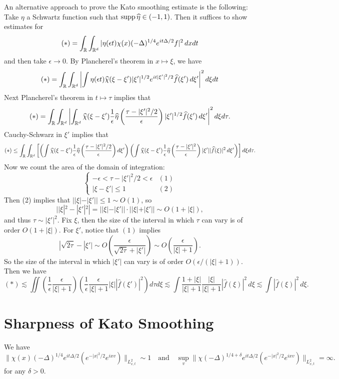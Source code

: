 \begin{remark}
  An alternative approach to prove the Kato smoothing
  estimate is the following: Take $\eta$ a
  Schwartz function such that
  $\operatorname{supp} \widehat{\eta} \in (-1, 1)$. Then it suffices
  to show estimates for
  \[
    (*) = \int_{\mathbb{R}} \int_{\mathbb{R}^d}
    |\eta(\epsilon t) \chi(x) (-\Delta)^{1 / 4} e^{it \Delta / 2} f|^2\, dx dt
  \]
  and then take $\epsilon \to 0$. By Plancherel's
  theorem in $x \mapsto \xi$, we have
  \[
    (*) = \int_{\mathbb{R}} \int_{\mathbb{R}^d}
    \left| \int \eta(\epsilon t) \widehat{\chi}(\xi - \xi') |\xi'|^{1 / 2} e^{it|\xi'|^2 / 2} \widehat{f}(\xi')\, d\xi' \right|^2 d\xi dt
  \]
  Next Plancherel's theorem in $t \mapsto \tau$
  implies that
  \[
    (*) = \int_{\mathbb{R}} \int_{\mathbb{R}^d}
    \left|
    \int_{\mathbb{R}^d} \widehat{\chi}(\xi - \xi')
    \frac{1}{\epsilon} \widehat{\eta}\left(\frac{\tau - |\xi'|^2 / 2}{\epsilon}\right) |\xi'|^{1 / 2} \widehat{f}(\xi')\, d\xi'
    \right|^2 d\xi d\tau.
  \]
  Cauchy-Schwarz in $\xi'$ implies that
  \[
    (*) \le
    \int_{\mathbb{R}} \int_{\mathbb{R}^d}
    \left[\left(\int \widehat{\chi}(\xi - \xi') \frac{1}{\epsilon} \widehat{\eta}\left(\frac{\tau - |\xi'|^2 / 2}{\epsilon}\right) d\xi'\right)
    \left(\int \widehat{\chi}(\xi - \xi') \frac{1}{\epsilon} \widehat{\eta} \left(\frac{\tau - |\xi'|^2}{\epsilon}\right) |\xi'| |\widehat{f}(\xi)|^2\, d\xi'\right)\right]
    d\xi d\tau
  .\]
  Now we count the area of the domain of integration:
  \[
    \begin{cases}
      -\epsilon < \tau - |\xi'|^2 / 2 < \epsilon & (1) \\
      |\xi - \xi'| \le 1 & (2)
    \end{cases}
  \]
  Then (2) implies that
  $||\xi| - |\xi'|| \le 1 \sim O(1)$, so
  \[
    ||\xi|^2 - |\xi'|^2|
    = ||\xi| - |\xi'|| \cdot ||\xi| + |\xi'||
    \sim O(1 + |\xi|),
  \]
  and thus $\tau \sim |\xi'|^2$. Fix $\xi$, then
  the size of the interval in which $\tau$ can vary
  is of order $O(1 + |\xi|)$. For $\xi'$,
  notice that $(1)$ implies
  \[
    |\sqrt{2\tau} - |\xi'|
    \sim O\left(\frac{\epsilon}{\sqrt{2\tau} + |\xi'|}\right)
    \sim O\left(\frac{\epsilon}{|\xi| + 1}\right).
  \]
  So the size of the interval in which
  $|\xi'|$ can vary is of order
  $O(\epsilon / (|\xi| + 1))$.  Then we have
  \[
    (*) \lesssim \iint \left(\frac{1}{\epsilon} \frac{\epsilon}{|\xi| + 1}\right)\left(\frac{1}{\epsilon} \frac{\epsilon}{|\xi| + 1}|\xi| |\widehat{f}(\xi')|^2\right) d\tau d\xi
    \lesssim \int \frac{1+ |\xi|}{|\xi| + 1} \frac{|\xi|}{|\xi| + 1} |\widehat{f}(\xi)|^2 \, d\xi
    \lesssim \int |\widehat{f}(\xi)|^2 \, d\xi.
  \]
\end{remark}

\section{Sharpness of Kato Smoothing}

\begin{lemma}
  We have
  \[
    \|\chi(x) (-\Delta)^{1 / 4} e^{i t \Delta / 2} (e^{-|x|^2 / 2} e^{ixv})\|_{L^2_{x, t}} \sim 1
    \quad \text{and} \quad
    \sup_{v} \| \chi (-\Delta)^{1 / 4 + \delta} e^{it\Delta / 2} (e^{-|x|^2 / 2} e^{ixv}) \|_{L^2_{x, t}} = \infty.
  \]
  for any $\delta > 0$.
\end{lemma}
